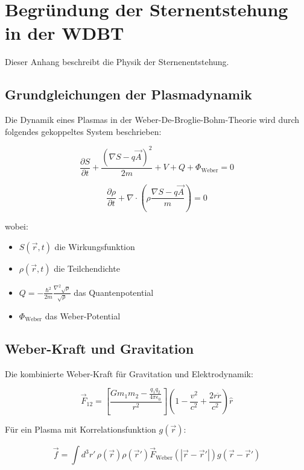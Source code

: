\chapter{Begründung der Sternentstehung in der WDBT}
\label{app:sternentstehung}
Dieser Anhang beschreibt die Physik der Sternenentstehung.

\section{Grundgleichungen der Plasmadynamik}
Die Dynamik eines Plasmas in der Weber-De-Broglie-Bohm-Theorie wird durch folgendes gekoppeltes System beschrieben:

\begin{equation}
\frac{\partial S}{\partial t} + \frac{(\nabla S - q\vec{A})^2}{2m} + V + Q + \Phi_{\text{Weber}} = 0
\end{equation}

\begin{equation}
\frac{\partial \rho}{\partial t} + \nabla \cdot \left(\rho \frac{\nabla S - q\vec{A}}{m}\right) = 0
\end{equation}

wobei:
\begin{itemize}
\item $S(\vec{r},t)$ die Wirkungsfunktion
\item $\rho(\vec{r},t)$ die Teilchendichte
\item $Q = -\frac{\hbar^2}{2m}\frac{\nabla^2 \sqrt{\rho}}{\sqrt{\rho}}$ das Quantenpotential
\item $\Phi_{\text{Weber}}$ das Weber-Potential
\end{itemize}

\section{Weber-Kraft und Gravitation}
Die kombinierte Weber-Kraft für Gravitation und Elektrodynamik:

\begin{equation}
\vec{F}_{12} = \left[\frac{Gm_1m_2 - \frac{q_1q_2}{4\pi\epsilon_0}}{r^2}\right]\left(1 - \frac{v^2}{c^2} + \frac{2r\ddot{r}}{c^2}\right)\hat{r}
\end{equation}

Für ein Plasma mit Korrelationsfunktion $g(\vec{r})$:

\begin{equation}
\vec{f} = \int d^3r'\, \rho(\vec{r})\rho(\vec{r}')\vec{F}_{\text{Weber}}(|\vec{r}-\vec{r}'|)g(\vec{r}-\vec{r}')
\end{equation}

